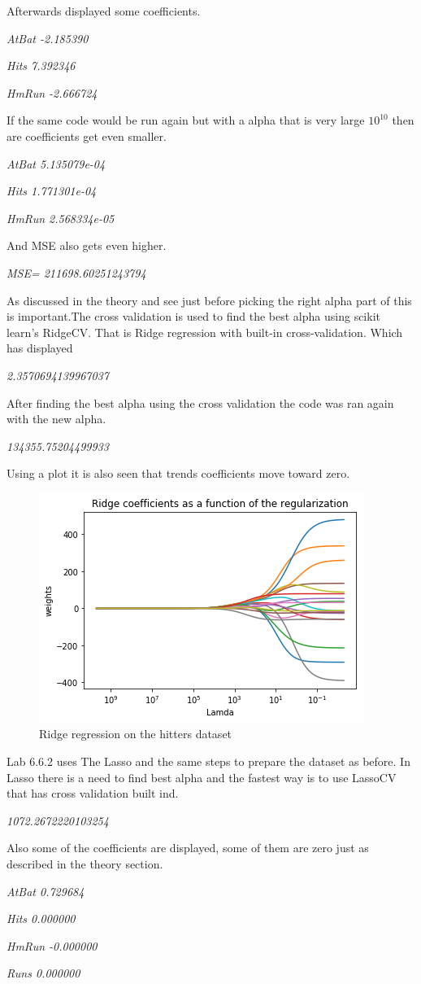 Afterwards displayed some coefficients.

\noindent\textit{AtBat  -2.185390}

\noindent\textit{Hits    7.392346}

\noindent\textit{HmRun  -2.666724}

If the same code would be run again but with a alpha that is very large $10^10$ then are coefficients get even smaller.

\noindent\textit{AtBat  5.135079e-04}

\noindent\textit{Hits    1.771301e-04}

\noindent\textit{HmRun  2.568334e-05}

And  MSE also gets even higher.

\noindent\textit{MSE= 211698.60251243794}

As discussed in the theory and see just before picking the right alpha part of this is important.The cross validation is used to find the best alpha using scikit learn's RidgeCV. That is Ridge regression with built-in cross-validation. Which has displayed 

\noindent\textit{2.3570694139967037}

After finding the best alpha using the cross validation the code was ran again with the new alpha.   

\noindent\textit{134355.75204499933}

Using a plot it is also seen that trends coefficients move toward zero.
\begin{figure}[H]
	\centering
	\includegraphics[width=0.45\linewidth]{shrinkageMethods/fig/plot}
	\caption{Ridge regression on the hitters dataset}
	\label{fig:plot}
\end{figure}
Lab 6.6.2 uses The Lasso and the same steps to prepare the dataset as before. In Lasso there is a need to find best alpha and the fastest way is to use LassoCV that has cross validation built ind.

\noindent\textit{1072.2672220103254}

Also some of the coefficients are displayed, some of them are zero just as described in the theory section.

\noindent\textit{AtBat          0.729684}

\noindent\textit{Hits           0.000000}

\noindent\textit{HmRun         -0.000000}

\noindent\textit{Runs           0.000000}